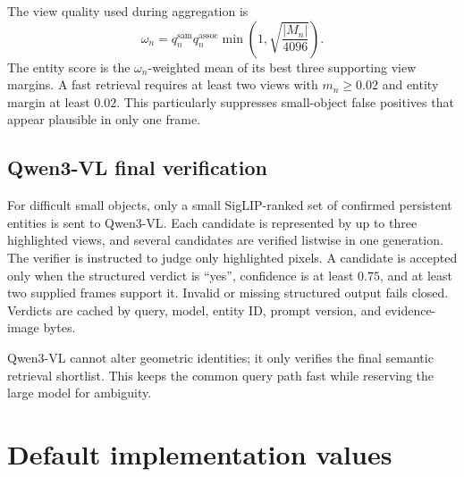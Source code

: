 \documentclass[11pt]{article}
\newcommand{\1}{\bm{1}}
\begin{document}
The view quality used during aggregation is
\begin{equation}
\omega_n=q_n^{\mathrm{sam}}q_n^{\mathrm{assoc}}
\min\left(1,\sqrt{\frac{|M_n|}{4096}}\right).
\end{equation}
The entity score is the $\omega_n$-weighted mean of its best three supporting
view margins. A fast retrieval requires at least two views with
$m_n\geq0.02$ and entity margin at least $0.02$. This particularly suppresses
small-object false positives that appear plausible in only one frame.

\subsection{Qwen3-VL final verification}

For difficult small objects, only a small SigLIP-ranked set of confirmed
persistent entities is sent to Qwen3-VL. Each candidate is represented by up to
three highlighted views, and several candidates are verified listwise in one
generation. The verifier is instructed to judge only highlighted pixels. A
candidate is accepted only when the structured verdict is ``yes'', confidence
is at least $0.75$, and at least two supplied frames support it. Invalid or
missing structured output fails closed. Verdicts are cached by query, model,
entity ID, prompt version, and evidence-image bytes.

Qwen3-VL cannot alter geometric identities; it only verifies the final semantic
retrieval shortlist. This keeps the common query path fast while reserving the
large model for ambiguity.

\section{Default implementation values}
\end{document}
